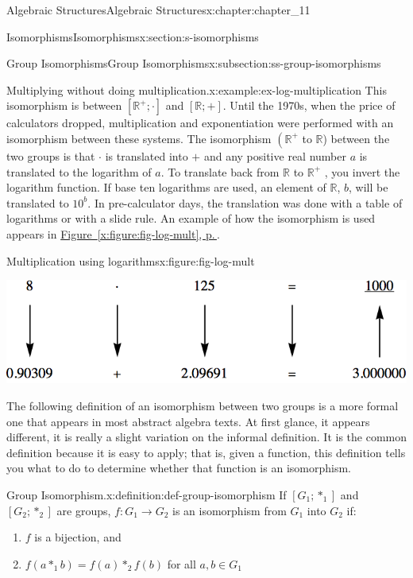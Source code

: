 \documentclass[twoside,10pt,]{book}
\newcommand{\xreffont}{\relax}
\numberwithin{equation}{section}
\begin{document}
\begin{chapterptx}{Algebraic Structures}{}{Algebraic Structures}{}{}{x:chapter:chapter_11}
\begin{sectionptx}{Isomorphisms}{}{Isomorphisms}{}{}{x:section:s-isomorphisms}
\begin{subsectionptx}{Group Isomorphisms}{}{Group Isomorphisms}{}{}{x:subsection:ss-group-isomorphisms}
\begin{example}{Multiplying without doing multiplication.}{x:example:ex-log-multiplication}
This isomorphism is between \(\left[\mathbb{R}^+ ; \cdot \right]\) and \([\mathbb{R};+]\). Until the 1970s, when the price of calculators dropped, multiplication and exponentiation were performed with an isomorphism between these systems. The isomorphism \(\left(\mathbb{R}^+\right.\) to \(\mathbb{R}\)) between the two groups is that \(\cdot\) is translated into \(+\) and any positive real number \(a\) is translated to the logarithm of \(a\). To translate back from \(\mathbb{R}\) to \(\mathbb{R}^+\) , you invert the logarithm function. If base ten logarithms are used, an element of \(\mathbb{R}\), \(b\), will be translated to \(10^b\).  In pre-calculator days, the translation was done with a table of logarithms or with a slide rule. An example of how the isomorphism is used appears in \hyperref[x:figure:fig-log-mult]{Figure~{\xreffont\ref{x:figure:fig-log-mult}}, p.\,\pageref{x:figure:fig-log-mult}}.%
\begin{figureptx}{Multiplication using logarithms}{x:figure:fig-log-mult}{}%
\begin{image}{0.15}{0.7}{0.15}%
\includegraphics[width=\linewidth]{images/fig-log-mult.png}
\end{image}%
\tcblower
\end{figureptx}%
\end{example}
The following definition of an isomorphism between two groups is a more formal one that appears in most abstract algebra texts. At first glance, it appears different, it is really a slight variation on the informal definition. It is the common definition because it is easy to apply; that is, given a function, this definition tells you what to do to determine whether that function is an isomorphism.%
\begin{definition}{Group Isomorphism.}{x:definition:def-group-isomorphism}%
%
\label{g:notation:idm404594301584}%
If \(\left[G_1 ; *_1\right]\) and \(\left[G_2 ; *_2\right]\) are groups, \(f: G_1 \to G_2\) is an isomorphism from \(G_1\) into \(G_2\) if:%
\begin{enumerate}[label=(\arabic*)]
\item{}\(f\) is a bijection, and%
\item{}\(f\left(a *_1 b\right) = f(a) *_2f(b)\)   for all \(a, b\in  G_1\)%

\end{enumerate}
\end{definition}
\end{subsectionptx}
\end{sectionptx}
\end{chapterptx}
\end{document}
